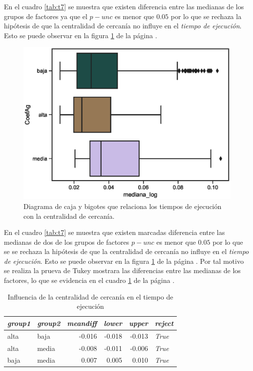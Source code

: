 \documentclass{article}
\begin{document}
En el cuadro \ref{tab:t7} se muestra que existen diferencia entre las medianas de los grupos de factores ya que el \emph{$p-unc$} es menor que $0.05$ por lo que se rechaza la hipótesis de que la centralidad de cercanía no influye en el \textit{tiempo de ejecución}. Esto se puede observar en la figura \ref{fig15} de la página \pageref{fig15}.

 \begin{center}
\begin{figure}[htbp]
\includegraphics[scale=0.6]{boxplot_CoefAg.eps}
\caption{Diagrama de caja y bigotes que relaciona los tiempos de ejecución con la centralidad de cercanía.}
\label{fig15}
\end{figure}
\end{center}

En el cuadro \ref{tab:t7} se muestra que existen marcadas diferencia entre las medianas de dos de los grupos de factores  \textbf{$p-unc$} es menor que $0.05$ por lo que se se rechaza la hipótesis de que la centralidad de cercanía no influye en el \textit{tiempo de ejecución}. Esto se puede observar en la figura \ref{fig15} de la página \pageref{fig15}. Por tal motivo se realiza la prueva de Tukey mostrara las diferencias entre las medianas de los factores, lo que se evidencia en el cuadro \ref{tab:t8} de la página \pageref{tab:t8}.
\begin{table}[htbp]
  \centering
  \caption{Influencia de la centralidad de cercanía en el tiempo de ejecución}
    \begin{tabular}{llrrrl}
    \toprule
    \textit{\textbf{group1}} & \textit{\textbf{group2}} & \multicolumn{1}{l}{\textit{\textbf{meandiff}}} & \multicolumn{1}{l}{\textit{\textbf{lower}}} & \multicolumn{1}{l}{\textit{\textbf{upper}}} & \textit{\textbf{reject}} \\
    \midrule
    alta  & baja  & -0.016 & -0.018 & -0.013 & \textit{True} \\
    alta  & media & -0.008 & -0.011 & -0.006 & \textit{True} \\
    baja  & media & 0.007 & 0.005 & 0.010 & \textit{True} \\
    \bottomrule
    \end{tabular}%
  \label{tab:t8}%
\end{table}%
\end{document}
